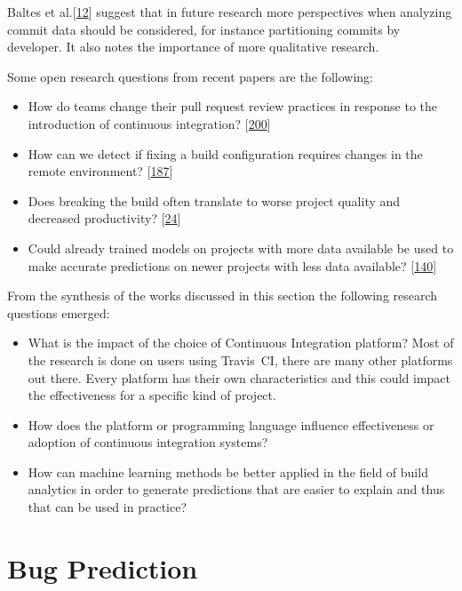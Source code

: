 \documentclass[]{book}
\providecommand{\tightlist}{%
  \setlength{\itemsep}{0pt}\setlength{\parskip}{0pt}}
\begin{document}
Baltes et al.{[}\protect\hyperlink{ref-baltes2018no}{12}{]} suggest that
in future research more perspectives when analyzing commit data should
be considered, for instance partitioning commits by developer. It also
notes the importance of more qualitative research.

Some open research questions from recent papers are the following:

\begin{itemize}
\tightlist
\item
  How do teams change their pull request review practices in response to
  the introduction of continuous integration?
  {[}\protect\hyperlink{ref-zhao2017impact}{200}{]}
\item
  How can we detect if fixing a build configuration requires changes in
  the remote environment?
  {[}\protect\hyperlink{ref-vassallo2018break}{187}{]}
\item
  Does breaking the build often translate to worse project quality and
  decreased productivity?
  {[}\protect\hyperlink{ref-beller2017oops}{24}{]}
\item
  Could already trained models on projects with more data available be
  used to make accurate predictions on newer projects with less data
  available? {[}\protect\hyperlink{ref-ni2018acona}{140}{]}
\end{itemize}

From the synthesis of the works discussed in this section the following
research questions emerged:

\begin{itemize}
\tightlist
\item
  What is the impact of the choice of Continuous Integration platform?
  Most of the research is done on users using Travis~CI, there are many
  other platforms out there. Every platform has their own
  characteristics and this could impact the effectiveness for a specific
  kind of project.
\item
  How does the platform or programming language influence effectiveness
  or adoption of continuous integration systems?
\item
  How can machine learning methods be better applied in the field of
  build analytics in order to generate predictions that are easier to
  explain and thus that can be used in practice?
\end{itemize}

\chapter{Bug Prediction}\label{bug-prediction}
\end{document}
